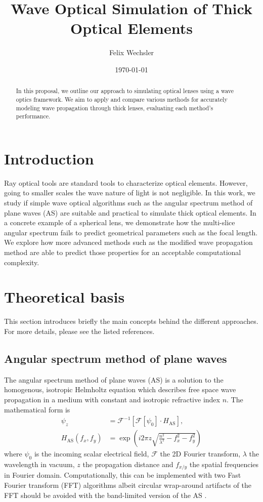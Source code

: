 \documentclass[a4paper,12pt]{article}
\title{Wave Optical Simulation of Thick Optical Elements}
\author{Felix Wechsler}
\date{\today}
\begin{document}
\maketitle
\thispagestyle{empty}

\begin{abstract}
In this proposal, we outline our approach to simulating optical lenses using a wave optics framework. We aim to apply and compare various methods for accurately modeling wave propagation through thick lenses, evaluating each method's performance.
\end{abstract}


\section{Introduction}
Ray optical tools are standard tools to characterize optical elements. However, going to smaller scales the wave nature of light is not negligible.
In this work, we study if simple wave optical algorithms such as the angular spectrum method of plane waves (AS) are suitable and practical to
simulate thick optical elements.
In a concrete example of a spherical lens, we demonstrate how the multi-slice angular spectrum fails to predict geometrical parameters such as the focal length.
We explore how more advanced methods such as the modified wave propagation method \cite{schmidt2016wave} are able to predict those properties for an 
acceptable computational complexity. 


\section{Theoretical basis}
This section introduces briefly the main concepts behind the different approaches.
For more details, please see the listed references.
\subsection{Angular spectrum method of plane waves}
The angular spectrum method of plane waves (AS) is a solution to the homogenous, isotropic Helmholtz equation which describes free space wave propagation
in a medium with constant and isotropic refractive index $n$.
The mathematical form is
\begin{align}
\psi_{z}&=\mathcal{F}^{-1}\left[\mathcal{F}\left[\psi_{0}\right] \cdot H_{\textrm{AS}}\right],\\
H_{\textrm{AS}}\left(f_{x},f_{y}\right)&=\exp\left(i2\pi z\sqrt{\frac{n^2}{\lambda^{2}}-f_{x}^{2}-f_{y}^{2}}\right)
\end{align}
where $\psi_0$ is the incoming scalar electrical field, $\mathcal{F}$ the 2D Fourier transform, $\lambda$ the wavelength in vacuum, $z$ the propagation distance and $f_{x/y}$ the spatial frequencies in Fourier domain.
Computationally, this can be implemented with two Fast Fourier transform (FFT) algorithms albeit circular wrap-around artifacts of the FFT should be avoided
with the band-limited version of the AS \cite{matsushima2009band}.
\end{document}
